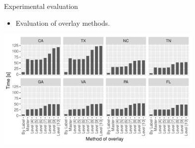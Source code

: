\documentclass{beamer}
\begin{document}
    \begin{frame}{Experimental evaluation}
        \begin{itemize}
            \item Evaluation of overlay methods.
        \end{itemize}
        \vspace{1cm}
        \centering
        \includegraphics[width=0.75\textwidth]{figures/overlay_tester}
    \end{frame}    
\end{document}
